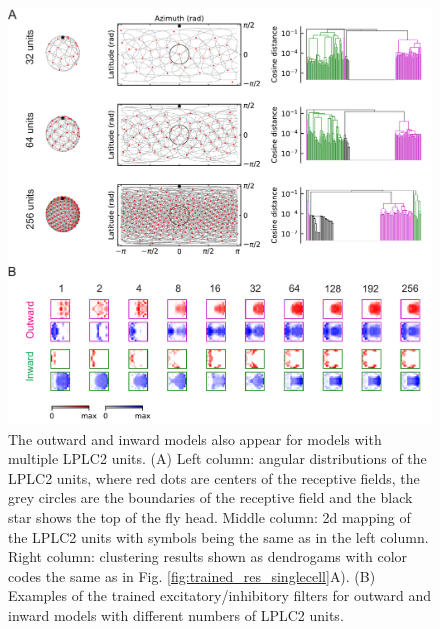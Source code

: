 \documentclass[9pt,lineno]{elife}
\begin{document}
\begin{figure}
\includegraphics[width=\linewidth]{figures/trained_results_multicells_paper.pdf}
\caption{The outward and inward models also appear for models with multiple LPLC2 units. (A) Left column: angular distributions of the LPLC2 units, where red dots are centers of the receptive fields, the grey circles are the boundaries of the receptive field and the black star shows the top of the fly head. Middle column: 2d mapping of the LPLC2 units with symbols being the same as in the left column. Right column: clustering results shown as dendrogams with color codes the same as in Fig. \ref{fig:trained_res_singlecell}A). (B) Examples of the trained excitatory/inhibitory filters for outward and inward models with different numbers of LPLC2 units.}
\label{fig:trained_res_multicells}

\end{figure}
\end{document}
